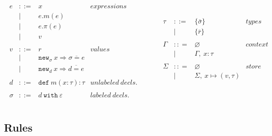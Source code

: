 \documentclass{llncs}
\newcommand{\keywadj}[1]{\mathtt{#1}}
\newcommand{\keyw}[1]{\keywadj{#1}~}
\begin{document}
\[
\begin{array}{lll}
\begin{array}{lllr}
	e & ::= & x & expressions \\
  		& | & e.m(e)\\
  		& | & e.\pi(e)\\
		& | & v \\
		&&\\
		
	v & ::= & r & values \\
  		& | & \keywadj{new}_{\sigma}~x \Rightarrow \overline{\sigma = e} \\
  		& | & \keywadj{new}_d~x \Rightarrow \overline{d = e} \\
		&&\\

	d & ::= & \keyw{def} m(x:\tau):\tau & unlabeled~decls.\\		&&\\
		
	\sigma & ::= & d~\keyw{with}\varepsilon  & labeled~ decls.\\
		&&\\
\end{array}
& ~~~~~~
&

\begin{array}{lllr}

	\tau & ::= & \{ \bar \sigma \}  & types \\
		& | & \{ \bar r \} \\
		&&\\

	\Gamma & :: = & \varnothing & context\\
		& | & \Gamma,~x : \tau\\
		&&\\

	\Sigma & :: = & \varnothing & store\\
		& | & \Sigma, ~x \mapsto (v, \tau)\\
		&&\\

&&\\

\end{array}
\end{array}
\]

\newpage

\subsection{Rules}
\end{document}
